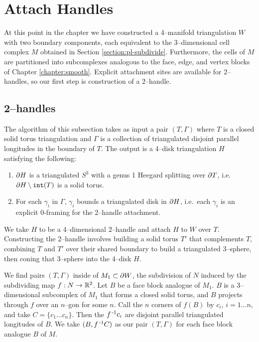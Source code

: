 \section{Attach Handles}
\label{section:pl-handle}

At this point in the chapter we have constructed a 4--manifold triangulation $W$ with two boundary components, each equivalent to the 3--dimensional cell complex $M$ obtained in Section \ref{section:pl-subdivide}.
Furthermore, the cells of $M$ are partitioned into subcomplexes analogous to the face, edge, and vertex blocks of Chapter \ref{chapter:smooth}.
Explicit attachment sites are available for 2--handles, so our first step is construction of a 2--handle.

\subsection{2--handles}
\label{section:pl-2-handle}

The algorithm of this subsection takes as input a pair $(T,\Gamma)$ where $T$ is a closed solid torus triangulation and $\Gamma$ is a collection of triangulated disjoint parallel longitudes in the boundary of $T$.
The output is a 4--disk triangulation $H$ satisfying the following:
\begin{enumerate}
	\item $\partial H$ is a triangulated $S^3$ with a genus 1 Heegard splitting over $\partial T$, i.e.\ $\partial H\setminus \texttt{int}(T)$ is a solid torus.
	\item For each $\gamma_i$ in $\Gamma$, $\gamma_i$ bounds a triangulated disk in $\partial H$, i.e.\ each $\gamma_i$ is an explicit 0-framing for the 2--handle attachment.
\end{enumerate}
We take $H$ to be a 4--dimensional 2--handle and attach $H$ to $W$ over $T$.
Constructing the 2--handle involves building a solid torus $T'$ that complements $T$, combining $T$ and $T'$ over their shared boundary to build a triangulated 3--sphere, then coning that 3--sphere into the 4--disk $H$.

We find pairs $(T,\Gamma)$ inside of $M_1\subset\partial W$, the subdivision of $N$ induced by the subdividing map $f:N\to\mathbb{R}^2$.
Let $B$ be a face block analogue of $M_1$.
$B$ is a 3--dimensional subcomplex of $M_1$ that forms a closed solid torus,
and $B$ projects through $f$ over an $n$--gon for some $n$.
Call the $n$ corners of $f(B)$ by $c_i$, $i=1\dots n$, and take $C=\{c_1\dots c_n\}$.
Then the $f^{\,\text{-}1} c_i$ are disjoint parallel triangulated longitudes of $B$.
We take $(B, f^{\,\text{-}1} C)$ as our pair $(T,\Gamma)$ for each face block analogue $B$ of $M$.

